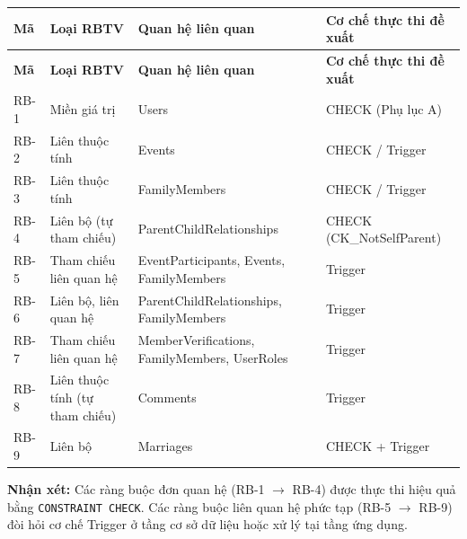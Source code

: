 \begingroup
\renewcommand{\arraystretch}{1.25}
\setlength{\tabcolsep}{5pt}
\begin{longtable}{|>{\raggedright\arraybackslash}p{}
		|>{\raggedright\arraybackslash}p{}
		|>{\raggedright\arraybackslash}p{}
		|>{\raggedright\arraybackslash}p{}|}
	\hline
	\textbf{Mã} & \textbf{Loại RBTV} & \textbf{Quan hệ liên quan} & \textbf{Cơ chế thực thi đề xuất} \\ \hline
	\endfirsthead
	\hline
	\textbf{Mã} & \textbf{Loại RBTV} & \textbf{Quan hệ liên quan} & \textbf{Cơ chế thực thi đề xuất} \\ \hline
	\endhead
	RB-1 & Miền giá trị & Users & CHECK (Phụ lục A) \\ \hline
	RB-2 & Liên thuộc tính & Events & CHECK / Trigger \\ \hline
	RB-3 & Liên thuộc tính & FamilyMembers & CHECK / Trigger \\ \hline
	RB-4 & Liên bộ (tự tham chiếu) & ParentChildRelationships & CHECK (CK\_NotSelfParent) \\ \hline
	RB-5 & Tham chiếu liên quan hệ & EventParticipants, Events, FamilyMembers & Trigger \\ \hline
	RB-6 & Liên bộ, liên quan hệ & ParentChildRelationships, FamilyMembers & Trigger \\ \hline
	RB-7 & Tham chiếu liên quan hệ & MemberVerifications, FamilyMembers, UserRoles & Trigger \\ \hline
	RB-8 & Liên thuộc tính (tự tham chiếu) & Comments & Trigger \\ \hline
	RB-9 & Liên bộ & Marriages & CHECK + Trigger \\ \hline
\end{longtable}
\endgroup

\vspace{0.8em}
\noindent\textbf{Nhận xét:} Các ràng buộc đơn quan hệ (RB-1 $\rightarrow$ RB-4) được thực thi hiệu quả bằng \texttt{CONSTRAINT CHECK}. Các ràng buộc liên quan hệ phức tạp (RB-5 $\rightarrow$ RB-9) đòi hỏi cơ chế Trigger ở tầng cơ sở dữ liệu hoặc xử lý tại tầng ứng dụng.
